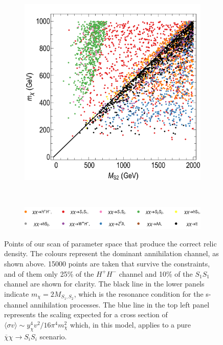 \begin{figure}[t]
\begin{subfigure}[t]{0.43\textwidth}
\label{fig:scan1c}
\end{subfigure}
\hspace{1em}
\begin{subfigure}[t]{0.43\textwidth}
\includegraphics[width=\textwidth]{texinputs/05_relic/figures/relic_scalar/MS2_mDM3.pdf}
\label{fig:scan1d}
\end{subfigure}\\
\begin{subfigure}[t]{0.86\textwidth}
\includegraphics[width=\textwidth]{texinputs/05_relic/figures/relic_scalar/LegendH2.pdf}
\end{subfigure}
\caption{Points of our scan of parameter space that produce the correct relic density. The colours represent the dominant annihilation channel, as shown above. 15000 points are taken that survive the constraints, and of them only 25\% of the $H^+H^-$ channel and 10\% of the $S_1S_1$ channel are shown for clarity. The black line in the lower panels indicate $m_\chi = 2 M_{S_1, S_2}$, which is the resonance condition for the s-channel annihilation processes. The blue line in the top left panel represents the scaling expected for a cross section of $\langle \sigma v \rangle \sim y^4_\chi v^2 / 16 \pi^4 m_\chi^2$ which, in this model, applies to a pure $\overline{\chi}\chi \to S_iS_i$ scenario.}
\label{fig:scan1}
\end{figure}

